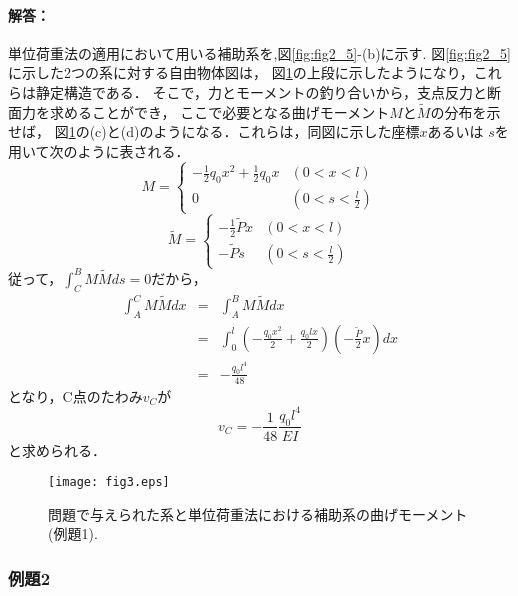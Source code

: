 ﻿\documentclass[10pt,a4j]{jarticle}
\begin{document}
\paragraph{解答：}
単位荷重法の適用において用いる補助系を,図\ref{fig:fig2_5}-(b)に示す.
図\ref{fig:fig2_5}に示した2つの系に対する自由物体図は，
図\ref{fig:fig3}の上段に示したようになり，これらは静定構造である．
そこで，力とモーメントの釣り合いから，支点反力と断面力を求めることができ，
ここで必要となる曲げモーメント$M$と$\tilde M$の分布を示せば，
図\ref{fig:fig3}の(c)と(d)のようになる．これらは，同図に示した座標$x$あるいは
$s$を用いて次のように表される．
\begin{equation}
	M = \left\{
	\begin{array}{cc}
		-\frac{1}{2}q_0x^2+\frac{1}{2}q_0x & (0<x<l) \\
		0 & \left( 0< s< \frac{l}{2}\right)
	\end{array}
	\right.
	\label{eqn:}
\end{equation}
\begin{equation}
	\tilde M = \left\{
	\begin{array}{cc}
		-\frac{1}{2}\tilde P x & \left( 0<x<l \right) \\
		-\tilde P s & \left( 0< s< \frac{l}{2}\right)
	\end{array}
	\right.
	\label{eqn:}
\end{equation}
従って，$\int_C^B M\tilde Mds=0$だから，
\begin{eqnarray}
	\int_A^CM\tilde M dx & = &  \int_A^BM\tilde M dx  \nonumber \\
	&=&
	\int_0^l
	\left(	-\frac{q_0x^2}{2}+\frac{q_0lx}{2}  \right)
	\left(	-\frac{\tilde P}{2}x \right)
	dx \\
	&= & -\frac{q_0l^4}{48}
	\label{eqn:}
\end{eqnarray}
となり，C点のたわみ$v_C$が
\begin{equation}
	v_C=-\frac{1}{48} \frac{q_0l^4}{EI}
	\label{eqn:}
\end{equation}
と求められる．
\begin{figure}[h]
	\begin{center}
	\texttt{[image: fig3.eps]} 
	\end{center}
	\caption{問題で与えられた系と単位荷重法における補助系の曲げモーメント(例題1).} 
	\label{fig:fig3}
\end{figure}
\subsubsection{例題2}
\end{document}

